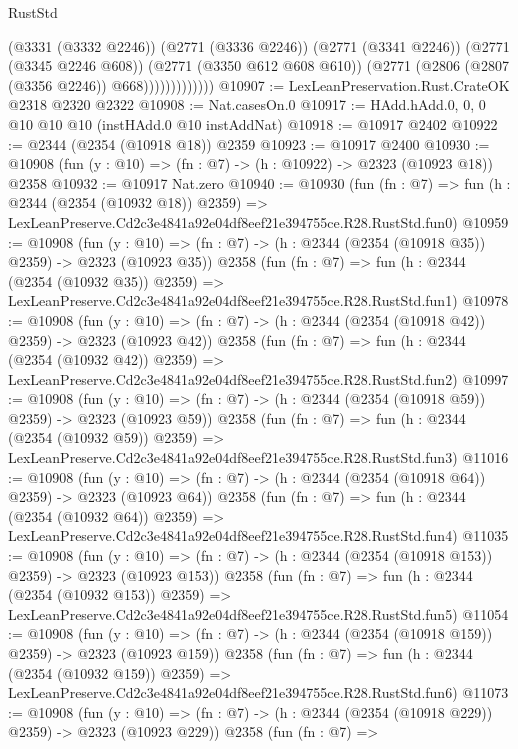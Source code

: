 \begin{lexlean}{RustStd}
\begin{coremodule}
                          (@3331 (@3332 @2246))
                          (@2771 (@3336 @2246))
                          (@2771 (@3341 @2246))
                          (@2771 (@3345 @2246 @608))
                          (@2771 (@3350 @612 @608 @610))
                          (@2771 (@2806 (@2807 (@3356 @2246)) @668)))))))))))))
@10907 := LexLeanPreservation.Rust.CrateOK @2318 @2320 @2322
@10908 := Nat.casesOn.{0}
@10917 := HAdd.hAdd.{0, 0, 0} @10 @10 @10 (instHAdd.{0} @10 instAddNat)
@10918 := @10917 @2402
@10922 := @2344 (@2354 (@10918 @18)) @2359
@10923 := @10917 @2400
@10930 := @10908 (fun (y : @10) => (fn : @7) -> (h : @10922) -> @2323 (@10923 @18)) @2358
@10932 := @10917 Nat.zero
@10940 := @10930
    (fun (fn : @7) =>
    fun (h : @2344 (@2354 (@10932 @18)) @2359) =>
    LexLeanPreserve.Cd2c3e4841a92e04df8eef21e394755ce.R28.RustStd.fun0)
@10959 := @10908
    (fun (y : @10) => (fn : @7) -> (h : @2344 (@2354 (@10918 @35)) @2359) -> @2323 (@10923 @35))
    @2358
    (fun (fn : @7) =>
    fun (h : @2344 (@2354 (@10932 @35)) @2359) =>
    LexLeanPreserve.Cd2c3e4841a92e04df8eef21e394755ce.R28.RustStd.fun1)
@10978 := @10908
    (fun (y : @10) => (fn : @7) -> (h : @2344 (@2354 (@10918 @42)) @2359) -> @2323 (@10923 @42))
    @2358
    (fun (fn : @7) =>
    fun (h : @2344 (@2354 (@10932 @42)) @2359) =>
    LexLeanPreserve.Cd2c3e4841a92e04df8eef21e394755ce.R28.RustStd.fun2)
@10997 := @10908
    (fun (y : @10) => (fn : @7) -> (h : @2344 (@2354 (@10918 @59)) @2359) -> @2323 (@10923 @59))
    @2358
    (fun (fn : @7) =>
    fun (h : @2344 (@2354 (@10932 @59)) @2359) =>
    LexLeanPreserve.Cd2c3e4841a92e04df8eef21e394755ce.R28.RustStd.fun3)
@11016 := @10908
    (fun (y : @10) => (fn : @7) -> (h : @2344 (@2354 (@10918 @64)) @2359) -> @2323 (@10923 @64))
    @2358
    (fun (fn : @7) =>
    fun (h : @2344 (@2354 (@10932 @64)) @2359) =>
    LexLeanPreserve.Cd2c3e4841a92e04df8eef21e394755ce.R28.RustStd.fun4)
@11035 := @10908
    (fun (y : @10) => (fn : @7) -> (h : @2344 (@2354 (@10918 @153)) @2359) -> @2323 (@10923 @153))
    @2358
    (fun (fn : @7) =>
    fun (h : @2344 (@2354 (@10932 @153)) @2359) =>
    LexLeanPreserve.Cd2c3e4841a92e04df8eef21e394755ce.R28.RustStd.fun5)
@11054 := @10908
    (fun (y : @10) => (fn : @7) -> (h : @2344 (@2354 (@10918 @159)) @2359) -> @2323 (@10923 @159))
    @2358
    (fun (fn : @7) =>
    fun (h : @2344 (@2354 (@10932 @159)) @2359) =>
    LexLeanPreserve.Cd2c3e4841a92e04df8eef21e394755ce.R28.RustStd.fun6)
@11073 := @10908
    (fun (y : @10) => (fn : @7) -> (h : @2344 (@2354 (@10918 @229)) @2359) -> @2323 (@10923 @229))
    @2358
    (fun (fn : @7) =>

\end{coremodule}
\end{lexlean}
